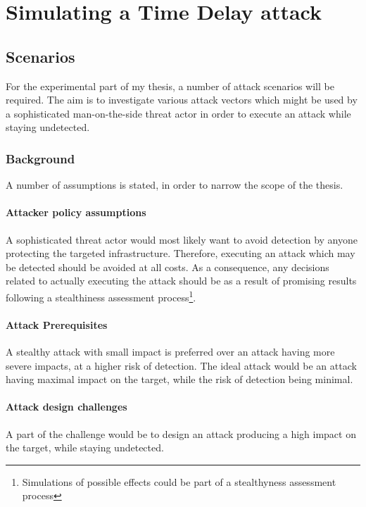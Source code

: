 \chapter{Simulating a Time Delay attack}



\section{Scenarios}

For the experimental part of my thesis, a number of attack scenarios will be required. The aim is to investigate various attack vectors which might be used by a sophisticated man-on-the-side threat actor in order to execute an attack while staying undetected. 

\subsection{Background} 

A number of assumptions is stated, in order to narrow the scope of the thesis.

\subsubsection{Attacker policy assumptions}
A sophisticated threat actor would most likely want to avoid detection by anyone protecting the targeted infrastructure.
Therefore, executing an attack which may be detected should be avoided at all costs.
As a consequence, any decisions related to actually executing the attack should be as a result of promising results following a stealthiness assessment process\footnote{Simulations of possible effects could be part of a stealthyness assessment process}. 

\subsubsection{Attack Prerequisites}
A stealthy attack with small impact is preferred over an attack having more severe impacts, at a higher risk of detection.
The ideal attack would be an attack having maximal impact on the target, while the risk of detection being minimal. 


\subsubsection{Attack design challenges}
A part of the challenge would be to design an attack producing a high impact on the target, while staying undetected.

